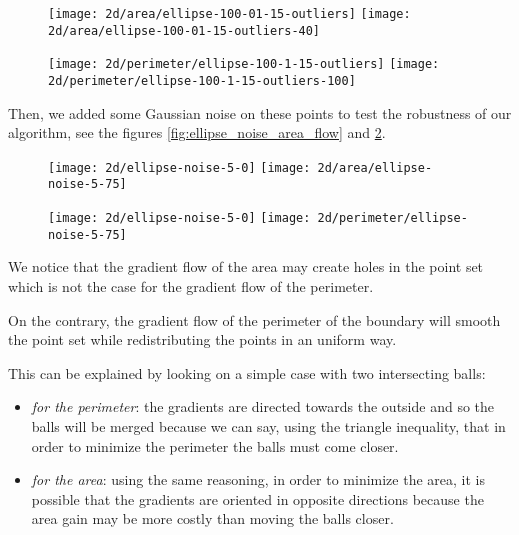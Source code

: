 \begin{figure}[h]
    \centering

    \texttt{[image: 2d/area/ellipse-100-01-15-outliers]}
    \texttt{[image: 2d/area/ellipse-100-01-15-outliers-40]}
    \label{fig:ellipse_outliers_area_flow}

    \texttt{[image: 2d/perimeter/ellipse-100-1-15-outliers]}
    \texttt{[image: 2d/perimeter/ellipse-100-1-15-outliers-100]}
    \label{fig:ellipse_outliers_perimeter_flow}
\end{figure}

Then, we added some Gaussian noise on these points to test the robustness of our
algorithm, see the figures \ref{fig:ellipse_noise_area_flow} and
\ref{fig:ellipse_noise_perimeter_flow}.

\begin{figure}[h]
    \centering

    \texttt{[image: 2d/ellipse-noise-5-0]}
    \texttt{[image: 2d/area/ellipse-noise-5-75]}
    \label{fig:ellipse_noise_area_flow}

    \texttt{[image: 2d/ellipse-noise-5-0]}
    \texttt{[image: 2d/perimeter/ellipse-noise-5-75]}
    \label{fig:ellipse_noise_perimeter_flow}
\end{figure}

We notice that the gradient flow of the area may create holes in the point set
which is not the case for the gradient flow of the perimeter.

On the contrary, the gradient flow of the perimeter of the boundary will smooth
the point set while redistributing the points in an uniform way.

This can be explained by looking on a simple case with two intersecting balls:
\begin{itemize}
    \item \textit{for the perimeter}: the gradients are directed towards the outside
        and so the balls will be merged because we can say, using the triangle
        inequality, that in order to minimize the perimeter the balls must come
        closer.
    \item \textit{for the area}: using the same reasoning, in order to minimize the area,
        it is possible that the gradients are oriented in opposite directions
        because the area gain may be more costly than moving the balls closer.
\end{itemize}

